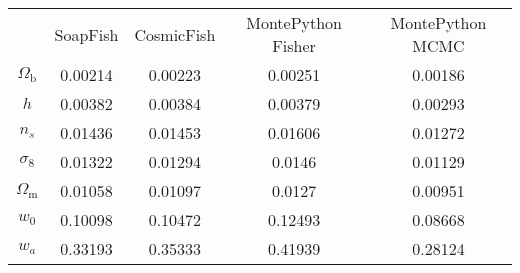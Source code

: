 \begin{table}
\centering
\begin{tabular}{|c|c|c|c|c|}
 & SoapFish & CosmicFish & MontePython Fisher & MontePython MCMC \\
$\Omega_\mathrm{b}$ & 0.00214 & 0.00223 & 0.00251 & 0.00186 \\
$h$ & 0.00382 & 0.00384 & 0.00379 & 0.00293 \\
$n_s$ & 0.01436 & 0.01453 & 0.01606 & 0.01272 \\
$\sigma_8$ & 0.01322 & 0.01294 & 0.0146 & 0.01129 \\
$\Omega_\mathrm{m}$ & 0.01058 & 0.01097 & 0.0127 & 0.00951 \\
$w_0$ & 0.10098 & 0.10472 & 0.12493 & 0.08668 \\
$w_a$ & 0.33193 & 0.35333 & 0.41939 & 0.28124 \\
\end{tabular}
\end{table}
